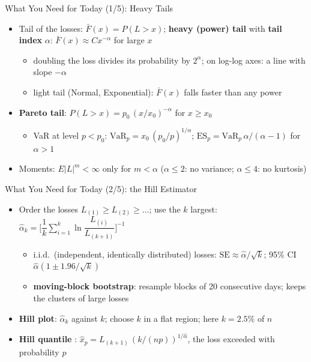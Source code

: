 \begin{frame}{What You Need for Today (1/5): Heavy Tails}
\itemsize{\small}
\begin{itemize}
    \item Tail of the losses: $\bar F(x) = P(L > x)$; \textbf{heavy (power) tail} with \textbf{tail index} $\alpha$: $\bar F(x) \approx C x^{-\alpha}$ for large $x$
    \begin{itemize}
        \item doubling the loss divides its probability by $2^\alpha$; on log-log axes: a line with slope $-\alpha$
        \item light tail (Normal, Exponential): $\bar F(x)$ falls faster than any power
    \end{itemize}
    \item \textbf{Pareto tail}: $P(L > x) = p_0\,(x/x_0)^{-\alpha}$ for $x \ge x_0$
    \begin{itemize}
        \item VaR at level $p < p_0$: $\mathrm{VaR}_p = x_0\,(p_0/p)^{1/\alpha}$; $\mathrm{ES}_p = \mathrm{VaR}_p\,\alpha/(\alpha - 1)$ for $\alpha > 1$
    \end{itemize}
    \item Moments: $E|L|^m < \infty$ only for $m < \alpha$ ($\alpha \le 2$: no variance; $\alpha \le 4$: no kurtosis)
\end{itemize}
\end{frame}

\begin{frame}{What You Need for Today (2/5): the Hill Estimator}
\itemsize{\small}
\begin{itemize}
    \item Order the losses $L_{(1)} \ge L_{(2)} \ge \dots$; use the $k$ largest: $\hat\alpha_k = \Big[\dfrac1k\sum_{i=1}^{k}\ln\dfrac{L_{(i)}}{L_{(k+1)}}\Big]^{-1}$ 
    \begin{itemize}
        \item i.i.d.\ (independent, identically distributed) losses: $\mathrm{SE} \approx \hat\alpha/\sqrt{k}$; 95\% CI $\hat\alpha(1 \pm 1.96/\sqrt{k})$
        \item \textbf{moving-block bootstrap}: resample blocks of 20 consecutive days; keeps the clusters of large losses
    \end{itemize}
    \item \textbf{Hill plot}: $\hat\alpha_k$ against $k$; choose $k$ in a flat region; here $k = 2.5\%$ of $n$
    \item \textbf{Hill quantile} : $\hat x_p = L_{(k+1)}\,(k/(np))^{1/\hat\alpha}$, the loss exceeded with probability $p$
\end{itemize}
\end{frame}

